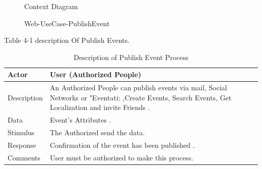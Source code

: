 \documentclass[12pt,a4paper,class,twoside,openany]{report}
\begin{document}
{\begin{figure}
\begin{center}
\caption{Context Diagram}
\label{fg:4-1}
\end{center}
\end{figure}

\begin{figure}
\begin{center}
\caption{Web-UseCase-PublishEvent}
\label{fg:4-2}
\end{center}
\end{figure}
Table 4-1 description Of Publish Events.
\begin{table}
\centering
\begin{tabular}{|l| p{10 cm} |}
\hline
Actor & User (Authorized People) \\ \hline
Description & An Authorized People can publish events via mail, Social Networks or "Eventati: ,Create Events, Search Events, Get Localization and invite Friends .\\ \hline
Data & Event's Attributes .\\ \hline
Stimulus & The Authorized send the data. \\ \hline
Response & Confirmation of the event has been published .\\ \hline
Comments & User must be authorized to make this process.\\ \hline
\end{tabular}
\caption{ Description of Publish Event Process}
\label{tab:table 4-1}
\end{table}

}
\end{document}
